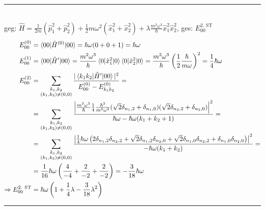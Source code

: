 \documentclass{article}
\newcommand{\lr}[1]{\left(#1\right)}
\begin{document}
{\color{blue}
\hrule
	\\
	geg: $\hat{H} = \frac{1}{2m}(\hat{p}_1^2 + \hat{p}_2^2) + \frac{1}{2}m\omega^2(\hat{x}_1^2 + \hat{x}_2^2) + \lambda\frac{m^2\omega^3}{\hbar}\hat{x}_1^2\hat{x}_2^2$, \qquad 	ges: $E_{00}^\text{2. ST}$
		\begin{align*}
			E_{00}^{(0)} &= \braket{0 0 | \hat{H}^{(0)} | 0 0} = \hbar\omega(0 + 0 + 1) = \hbar\omega \\
			E_{00}^{(1)} &= \braket{0 0 | \hat{H}' | 0 0} = \frac{m^2\omega^3}{\hbar} \braket{0 | \hat{x}_1^2 | 0} \braket{0 | \hat{x}_2^2| 0} = \frac{m^2\omega^3}{\hbar} \lr{\frac{1}{2}\frac{\hbar}{m\omega}}^2 = \frac{1}{4}\hbar\omega \\
			E_{00}^{(2)} &= \sum_{\substack{k_1,k_2\\ (k_1,k_2)\neq (0,0)}} \frac{|\braket{k_1 k_2 | \hat{H}' | 0 0}|^2}{E_{00}^{(0)} - E_{k_1 k_2}^{(0)}} = \\
			&= \sum_{\substack{k_1,k_2\\ (k_1,k_2)\neq (0,0)}} \frac{ \left| \frac{m^2\omega^3}{\hbar} \frac{1}{4}\frac{\hbar^2}{m^2\omega^2} (\sqrt{2}\delta_{n_1,2} + \delta_{n_1,0})(\sqrt{2}\delta_{n_2,2} + \delta_{n_2,0}) \right|^2 }{ \hbar\omega - \hbar\omega(k_1 + k_2 + 1) } = \\
			 &= \sum_{\substack{k_1,k_2\\ (k_1,k_2)\neq (0,0)}} \frac{ \left| \frac{1}{4}\hbar\omega \lr{ 2\delta_{n_1,2}\delta_{n_2,2} + \sqrt{2}\delta_{n_1,2}\delta_{n_2,0} + \sqrt{2}\delta_{n_1,0}\delta_{n_2,2} + \delta_{n_1,0}\delta_{n_2,0} } \right|^2 }{-\hbar\omega( k_1 + k_2)} = \\
			 &= \frac{1}{16} \hbar\omega \lr{ \frac{4}{-4} + \frac{2}{-2} + \frac{2}{-2} } = -\frac{3}{18}\hbar\omega \\
			 \Rightarrow E_{00}^\text{2. ST} &= \hbar\omega\lr{ 1 + \frac{1}{4} \lambda - \frac{3}{18} \lambda^2 }
		\end{align*}
\hrule
}


\newpage
\end{document}
